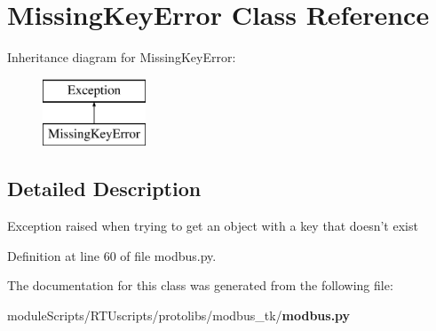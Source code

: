 \section{Missing\+Key\+Error Class Reference}
\label{classprotolibs_1_1modbus__tk_1_1modbus_1_1_missing_key_error}
Inheritance diagram for Missing\+Key\+Error\+:\begin{figure}[H]
\begin{center}
\leavevmode
\includegraphics[height=2.000000cm]{classprotolibs_1_1modbus__tk_1_1modbus_1_1_missing_key_error}
\end{center}
\end{figure}


\subsection{Detailed Description}
\begin{DoxyVerb}Exception raised when trying to get an object with a key that doesn't exist
\end{DoxyVerb}
 

Definition at line 60 of file modbus.\+py.



The documentation for this class was generated from the following file\+:\begin{DoxyCompactItemize}
\item 
module\+Scripts/\+R\+T\+Uscripts/protolibs/modbus\+\_\+tk/{\bf modbus.\+py}\end{DoxyCompactItemize}
